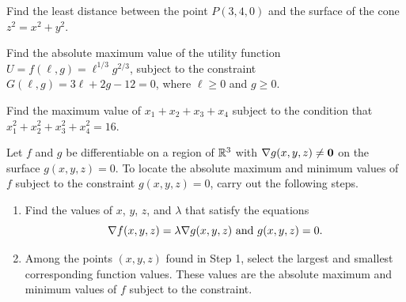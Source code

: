 \documentclass[../mathNotesPreamble]{subfiles}
\begin{document}
  \begin{ex*}
    Find the least distance between the point $P(3,4,0)$ and the surface of the cone $z^2=x^2+y^2$.
  \end{ex*}
  \pagebreak

  \begin{ex*}
    Find the absolute maximum value of the utility function $U=f(\ell,g)=\ell^{1/3} g^{2/3}$, subject to the constraint $G(\ell, g)=3\ell+2g-12=0$, where $\ell\geq 0$ and $g\geq 0$.
  \end{ex*}
  \pagebreak

  \begin{ex*}
    Find the maximum value of $x_1+x_2+x_3+x_4$ subject to the condition that $x_1^2+x_2^2+x_3^2+x_4^2=16$.
  \end{ex*}
  \pagebreak

  \begin{thmBox*}
    Let $f$ and $g$ be differentiable on a region of $\mathbb{R}^3$ with $\nabla g(x,y,z)\neq \mathbf{0}$ on the surface $g(x,y,z)=0$. To locate the absolute maximum and minimum values of $f$ subject to the constraint $g(x,y,z)=0$, carry out the following steps.
    \begin{enumerate}
      \item 
        Find the values of $x$, $y$, $z$, and $\lambda$ that satisfy the equations
          \[\nabla f(x,y,z)=\lambda\nabla g(x,y,z)\textnormal{ and } g(x,y,z)=0.\]
      \item 
        Among the points $(x,y,z)$ found in Step 1, select the largest and smallest corresponding function values. These values are the absolute maximum and minimum values of $f$ subject to the constraint.
    \end{enumerate}
  \end{thmBox*}

  \pagebreak
  
\end{document}
